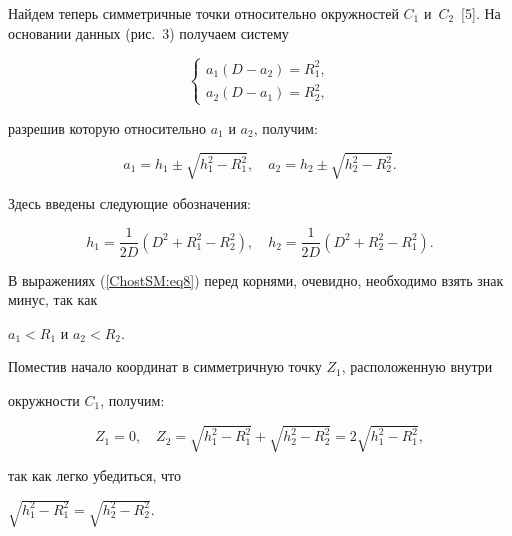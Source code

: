 Найдем теперь симметричные точки относительно окружностей $C_{1}$ и~$C_{2}$~[5]. На основании данных (рис.~3) получаем систему 

\begin{equation}

\label{ChostSM:eq7}

\left\{ {\begin{array}{l}

 a_1 (D - a_2 ) = R_1^2 , \\ 

 a_2 (D - a_1 ) = R_2^2 ,  

 \end{array}} \right.

\end{equation}

разрешив которую относительно $a_{1}$ и $a_{2}$, получим:

\begin{equation}

\label{ChostSM:eq8}

a_1 = h_1\pm \sqrt {h_1^2 - R_1^2 }, \quad a_2 = h_2\pm \sqrt {h_2^2 - R_2^2 } .

\end{equation}

Здесь введены следующие обозначения:

\[

h_1 = \frac{1}{2D}(D^2 + R_1 ^2 - R_2 ^2), \quad h_2 = \frac{1}{2D}(D^2 + R_2 ^2 - R_1 ^2).

\]



В выражениях (\ref{ChostSM:eq8}) перед корнями, очевидно, необходимо взять знак минус, так как 

$a_{1}<R_{1}$ и $a_{2}<R_{2}$.



Поместив начало координат в симметричную точку $Z_{1}$, расположенную внутри 

окружности $C_{1}$, получим:

\[

Z_1 = 0,\quad Z_2 = \sqrt {h_1 ^2 - R_1 ^2} + \sqrt {h_2 ^2 - R_2 ^2} = 2\sqrt 

{h_1 ^2 - R_1 ^2} ,

\]

так как легко убедиться, что

$

\sqrt {h_1 ^2 - R_1 ^2} = \sqrt {h_2 ^2 - R_2 ^2}.

$



